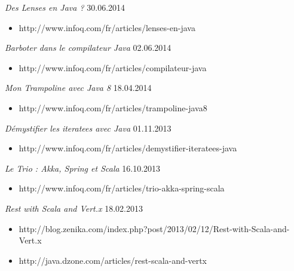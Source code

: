 \documentclass{res}
\begin{document}
\begin{resume}
{{\sl Des Lenses en Java ?}  \hfill    30.06.2014	\\
\vspace{-5mm}
\begin{itemize}
 \item[]  \scriptsize http://www.infoq.com/fr/articles/lenses-en-java
\end{itemize}
\vspace{-2mm}

{\sl Barboter dans le compilateur Java}  \hfill    02.06.2014	\\
\vspace{-5mm}
\begin{itemize}
 \item[]  \scriptsize http://www.infoq.com/fr/articles/compilateur-java
\end{itemize}
\vspace{-2mm}

{\sl Mon Trampoline avec Java 8}  \hfill    18.04.2014	\\
\vspace{-5mm}
\begin{itemize}
 \item[]  \scriptsize http://www.infoq.com/fr/articles/trampoline-java8
\end{itemize}
\vspace{-2mm}

{\sl Démystifier les iteratees avec Java}  \hfill    01.11.2013	\\
\vspace{-5mm}
\begin{itemize}
 \item[]  \scriptsize http://www.infoq.com/fr/articles/demystifier-iteratees-java
\end{itemize}
\vspace{-2mm}

{\sl Le Trio : Akka, Spring et Scala}  \hfill    16.10.2013	\\
\vspace{-5mm}  \begin{itemize}
 \item[]  \scriptsize http://www.infoq.com/fr/articles/trio-akka-spring-scala
\end{itemize}
\vspace{-2mm}

{\sl Rest with Scala and Vert.x}  \hfill    18.02.2013	\\
\vspace{-5mm}  \begin{itemize}
\item[]  \scriptsize http://blog.zenika.com/index.php?post/2013/02/12/Rest-with-Scala-and-Vert.x
\vspace{-2mm}
\item[]  \scriptsize http://java.dzone.com/articles/rest-scala-and-vertx
\end{itemize}
\vspace{-2mm}

}
\end{resume}
\end{document}
